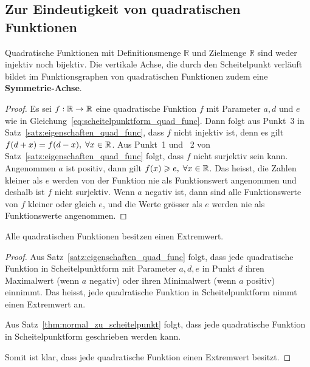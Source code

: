 \documentclass[12pt]{article}
\begin{document}
\subsection{Zur Eindeutigkeit von quadratischen Funktionen}
\begin{lemma}
Quadratische Funktionen mit Definitionsmenge $\mathbb{R}$ und Zielmenge $\mathbb{R}$ sind weder injektiv noch bijektiv. Die vertikale Achse, die durch den Scheitelpunkt verläuft bildet im Funktionsgraphen von quadratischen Funktionen zudem eine \textbf{Symmetrie-Achse}.
\end{lemma}

\begin{proof}
Es sei $f: \mathbb{R} \rightarrow \mathbb{R}$ eine quadratische Funktion $f$ mit Parameter $a, d$ und $e$ wie in Gleichung~\ref{eq:scheitelpunktform_quad_func}. Dann folgt aus Punkt~3 in Satz~\ref{satz:eigenschaften_quad_func}, dass $f$ nicht injektiv ist, denn es gilt $f(d+x)=f(d-x), \; \forall x \in \mathbb{R}$.
Aus Punkt~1 und ~2 von Satz~\ref{satz:eigenschaften_quad_func} folgt, dass $f$ nicht surjektiv sein kann. Angenommen $a$ ist positiv, dann gilt $f(x) \geqslant e, \; \forall x \in \mathbb{R}$. Das heisst, die Zahlen kleiner als $e$ werden von der Funktion nie als Funktionswert angenommen und deshalb ist $f$ nicht surjektiv. Wenn $a$ negativ ist, dann sind alle Funktionswerte von $f$ kleiner oder gleich $e$, und die Werte grösser als $e$ werden nie als Funktionswerte angenommen.
\end{proof}

\begin{lemma}
Alle quadratischen Funktionen besitzen einen Extremwert.
\end{lemma}
\begin{proof}
Aus Satz~\ref{satz:eigenschaften_quad_func} folgt, dass jede quadratische Funktion in Scheitelpunktform mit Parameter $a, d, e$ in Punkt $d$ ihren Maximalwert (wenn $a$ negativ) oder ihren Minimalwert (wenn $a$ positiv) einnimmt. Das heisst, jede quadratische Funktion in Scheitelpunktform nimmt einen Extremwert an.

Aus Satz~\ref{thm:normal_zu_scheitelpunkt} folgt, dass jede quadratische Funktion in Scheitelpunktform geschrieben werden kann.

Somit ist klar, dass jede quadratische Funktion einen Extremwert besitzt.
\end{proof}


\newpage
\end{document}

